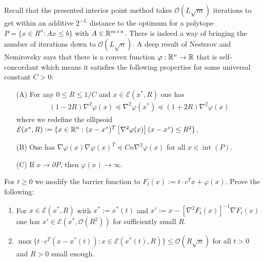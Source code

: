 \documentclass[10pt]{article}
\begin{document}
\begin{problem}[Problem 2]
    Recall that the presented interior point method takes \( \mathcal{O} (L\sqrt{m}) \) iterations to get within an additive \( 2^{-L} \) distance to the optimum for a polytope \( P = \{ x\in R^n : Ax\leq b \}  \) with \( A\in \mathbb{R}^{m\times n} \). There is indeed a way of bringing the number of iterations down to \( \mathcal{O} (L\sqrt{n}) \). A deep result of Nesterov and Nemirovsky says that there is a convex function \( \varphi: \mathbb{R}^n \to \mathbb{R} \) that is self-concordant which means it satisfies the following properties for some universal constant \( C > 0 \):
    \begin{enumerate}
        \item[(A)] For any \( 0\leq R \leq 1/C \) and \( x\in \mathcal{E}(x^*,R) \) one has 
            \begin{align*}
                (1-2R)\nabla^2\varphi(x) \preceq \nabla^2\varphi(x^*) \preceq (1+2R)\nabla^2\varphi(x)  
            \end{align*}
            where we redefine the ellipsoid \( \mathcal{E}(x^*,R) := \{x\in \mathbb{R}^n : (x-x^*)^T \left[\nabla^2 \varphi(x) \right](x-x^*) \leq R^2 \} \).
        \item[(B)] One has \( \nabla \varphi(x)\nabla \varphi(x)^T \preceq Cn\nabla^2\varphi(x) \) for all \( x\in \operatorname{int}(P) \).
        \item[(C)] If \( x\to\partial P \), then \( \varphi(x) \to \infty \).
    \end{enumerate}
    For \( t\geq 0 \) we modify the barrier function to \( F_t(x) := t\cdot c^Tx+\varphi(x) \). Prove the following:
    \begin{enumerate}
        \item For \( x \in \mathcal{E} (x^*,R) \) with \( x^*:= x^*(t) \) and \( x':= x-\left[\nabla^2F_t(x)\right]^{-1}\nabla F_t(x) \) one has \( x'\in \mathcal{E} (x^*, \mathcal{O}(R^2)) \) for sufficiently small \( R \). 
        \item \( \max\{t\cdot c^T(x-x^*(t)) : x\in \mathcal{E}(x^*(t),R)\} \leq \mathcal{O} (R\sqrt{n}) \) for all \( t > 0 \) and \( R>0 \) small enough.
    \end{enumerate}
\end{problem}
\end{document}
